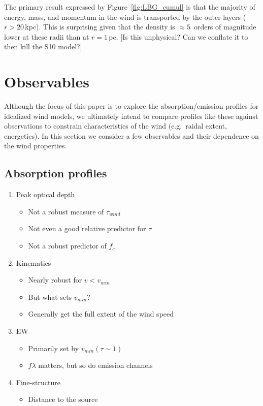 \documentclass[12pt,preprint]{aastex}
\begin{document}
The primary result expressed by Figure~\ref{fig:LBG_cumul} is that the
majority of energy, mass, and momentum in the wind is transported by
the outer layers ($r > 20$\,kpc).  This is surprising given that the
density is $\approx 5$~orders of magnitude lower at these radii than
at $r = 1$\,pc.  [Is this unphysical?  Can we conflate it to then kill
the S10 model?]

\section{Observables}
\label{sec:obs}

Although the focus of this paper is to explore the absorption/emission
profiles for idealized wind models, we ultimately intend to compare 
profiles like these against observations to constrain characteristics
of the wind (e.g.\ raidal extent, energetics).  In this section we
consider a few observables and their dependence on the wind properties.

\subsection{Absorption profiles}

 \begin{enumerate}
   \item Peak optical depth
     \begin{itemize}
       \item Not a robust measure of $\tau_{wind}$
       \item Not even a good relative predictor for $\tau$
       \item Not a robust predictor of $f_c$
     \end{itemize}
   \item Kinematics
     \begin{itemize}
       \item Nearly robust for $v<v_{min}$
       \item But what sets $v_{min}$?
       \item Generally get the full extent of the wind speed
     \end{itemize}
   \item EW
     \begin{itemize}
       \item Primarily set by $v_{min}(\tau \sim 1)$
       \item $f\lambda$ matters, but so do emission channels
     \end{itemize}
   \item Fine-structure
     \begin{itemize}
       \item Distance to the source
     \end{itemize}
 \end{enumerate}
     
\end{document}
